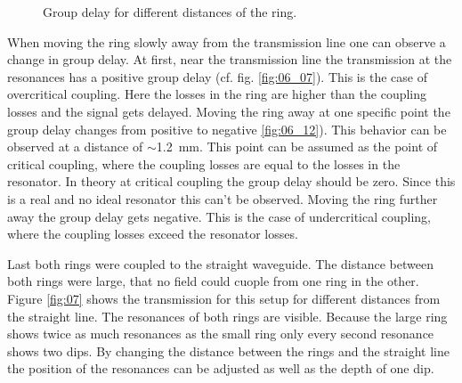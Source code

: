 \begin{figure}[t]
\caption{Group delay for different distances of the ring.}%
\label{fig:06}%
\end{figure}
When moving the ring slowly away from the transmission line one can observe a change in group delay. At first, near the transmission line the transmission at the resonances has a positive group delay (cf. fig. \ref{fig:06_07}). This is the case of overcritical coupling. Here the losses in the ring are higher than the coupling losses and the signal gets delayed. Moving the ring away at one specific point the group delay changes from positive to negative \ref{fig:06_12}). This behavior can be observed at a distance of $\sim$1.2~mm. This point can be assumed as the point of critical coupling, where the coupling losses are equal to the losses in the resonator. In theory at critical coupling the group delay should be zero. Since this is a real and no ideal resonator this can't be observed.
Moving the ring further away the group delay gets negative. This is the case of undercritical coupling, where the coupling losses exceed the resonator losses. 

Last both rings were coupled to the straight waveguide. The distance between both rings were large, that no field could cuople from one ring in the other. Figure \ref{fig:07} shows the transmission for this setup for different distances from the straight line. The resonances of both rings are visible. Because the large ring shows twice as much resonances as the small ring only every second resonance shows two dips. By changing the distance between the rings and the straight line the position of the resonances can be adjusted as well as the depth of one dip.

